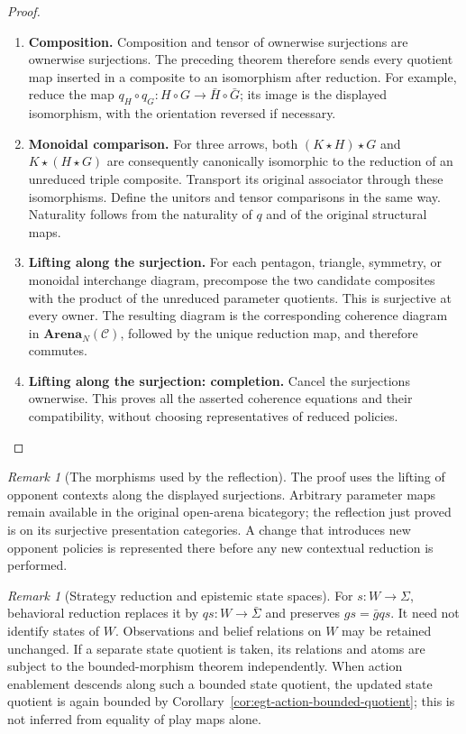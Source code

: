 \documentclass[11pt,a4paper]{article}
\numberwithin{equation}{section}
\theoremstyle{definition}
\theoremstyle{remark}
\newtheorem{remark}[theorem]{Remark}
\theoremstyle{plain}
\begin{document}
\begin{proof}
\leavevmode
\begin{enumerate}[label=\textup{(\arabic*)},leftmargin=*,itemsep=4pt,topsep=3pt]
  \item \textbf{Composition.} Composition and tensor of ownerwise surjections are ownerwise
surjections. The preceding theorem therefore sends every quotient map
inserted in a composite to an isomorphism after reduction. For example,
reduce the map $q_H\circ q_G:H\circ G\to\bar H\circ\bar G$;
its image is the displayed isomorphism, with the orientation reversed
if necessary.
  \item \textbf{Monoidal comparison.} For three arrows, both $(K\star H)\star G$ and
$K\star(H\star G)$ are consequently canonically isomorphic to the
reduction of an unreduced triple composite. Transport its original
associator through these isomorphisms. Define the unitors and tensor
comparisons in the same way. Naturality follows from the naturality of
$q$ and of the original structural maps.
  \item \textbf{Lifting along the surjection.} For each pentagon, triangle, symmetry, or monoidal interchange diagram,
precompose the two candidate composites with the product of the
unreduced parameter quotients. This is surjective at every owner. The resulting diagram is the corresponding coherence diagram in
$\mathbf{Arena}_N(\mathcal C)$, followed by the unique reduction map,
and therefore commutes.
  \item \textbf{Lifting along the surjection: completion.} Cancel the surjections ownerwise. This proves
all the asserted coherence equations and their compatibility, without
choosing representatives of reduced policies.
\end{enumerate}
\end{proof}


\begin{remark}[The morphisms used by the reflection]
The proof uses the lifting of opponent contexts along the displayed
surjections. Arbitrary parameter maps remain available in the original
open-arena bicategory; the reflection just proved is on its surjective
presentation categories. A change that introduces new opponent policies
is represented there before any new contextual reduction is performed.
\end{remark}

\begin{remark}[Strategy reduction and epistemic state spaces]
For $s:W\to\Sigma$, behavioral reduction replaces it by
$qs:W\to\bar\Sigma$ and preserves $gs=\bar gqs$. It need not identify
states of $W$. Observations and belief relations on $W$ may be retained
unchanged. If a separate state quotient is taken, its relations and atoms
are subject to the bounded-morphism theorem independently. When action
enablement descends along such a bounded state quotient, the updated
state quotient is again bounded by
Corollary~\ref{cor:egt-action-bounded-quotient}; this is not inferred
from equality of play maps alone.
\end{remark}
\end{document}
